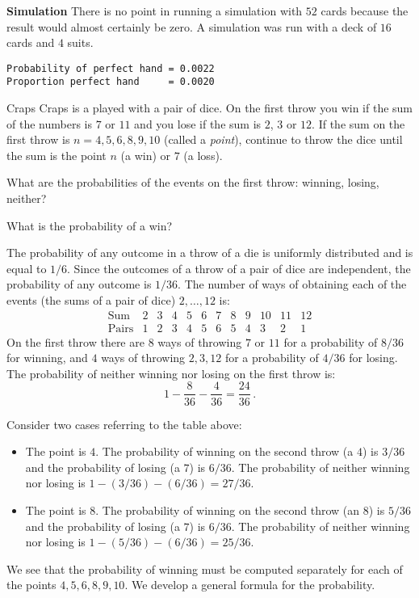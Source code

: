 \textbf{Simulation}
There is no point in running a simulation with $52$ cards because the result would almost certainly be zero. A simulation was run with a deck of $16$ cards and $4$ suits.

\begin{verbatim}
Probability of perfect hand = 0.0022
Proportion perfect hand     = 0.0020
\end{verbatim}


\begin{prob}{Craps}
Craps is a played with a pair of dice. On the first throw you win if the sum of the numbers is $7$ or $11$ and you lose if the sum is $2$, $3$ or $12$. If the sum on the first throw is $n=4,5,6,8,9,10$ (called a \emph{point}), continue to throw the dice until the sum is the point $n$ (a win) or $7$ (a loss).

 What are the probabilities of the events on the first throw: winning, losing, neither?

 What is the probability of a win?
\end{prob}


 The probability of any outcome in a throw of a die is uniformly distributed and is equal to $1/6$. Since the outcomes of a throw of a pair of dice are independent, the probability of any outcome is $1/36$. The number of ways of obtaining each of the events (the sums of a pair of dice) $2,\ldots,12$ is:
\[
\begin{array}{l|rrrrrrrrrrr}
\textrm{Sum} & 2 & 3 & 4 & 5 & 6 & 7 & 8 & 9 & 10 & 11 & 12\\\hline
\textrm{Pairs} & 1 & 2 & 3 & 4 & 5 & 6 & 5 & 4 & 3 & 2 & 1
\end{array}
\]
On the first throw there are $8$ ways of throwing $7$ or $11$ for a probability of $8/36$ for winning, and $4$ ways of throwing $2,3,12$ for a probability of $4/36$ for losing. The probability of neither winning nor losing on the first throw is:
\[
1 - \frac{8}{36} - \frac{4}{36} = \frac{24}{36}\,.
\]

Consider two cases referring to the table above:
\begin{itemize}
\item The point is $4$. The probability of winning on the second throw (a $4$) is $3/36$ and the probability of losing (a $7$) is $6/36$. The probability of neither winning nor losing is $1-(3/36)-(6/36)=27/36$.
\item The point is $8$. The probability of winning on the second throw (an $8$) is $5/36$ and the probability of losing (a $7$) is $6/36$. The probability of neither winning nor losing is $1-(5/36)-(6/36)=25/36$.
\end{itemize}
We see that the probability of winning must be computed separately for each of the points $4,5,6,8,9,10$. We develop a general formula for the probability.

